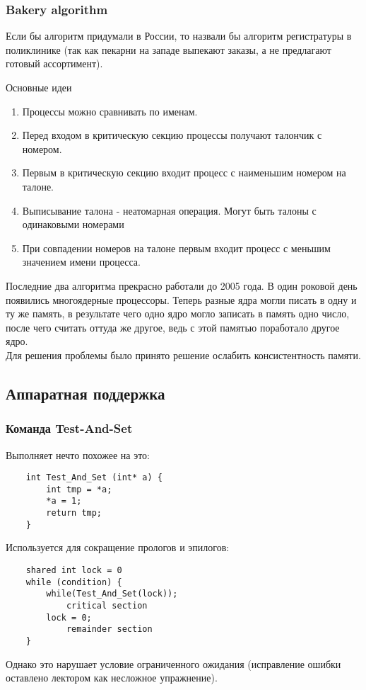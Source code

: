 \documentclass[12pt, a4paper]{article}
\begin{document}
    \subsubsection*{Bakery algorithm}
    Если бы алгоритм придумали в России, то назвали бы алгоритм регистратуры в поликлинике (так как пекарни на западе выпекают заказы, а не предлагают готовый ассортимент).
    \begin{center}
        Основные идеи
    \end{center}
    \begin{enumerate}
        \item Процессы можно сравнивать по именам.
        \item Перед входом в критическую секцию процессы получают талончик с номером.
        \item Первым в критическую секцию входит процесс с наименьшим номером на талоне.
        \item Выписывание талона - неатомарная операция. Могут быть талоны с одинаковыми номерами
        \item При совпадении номеров на талоне первым входит процесс с меньшим значением имени процесса.
    \end{enumerate}
    Последние два алгоритма прекрасно работали до 2005 года. В один роковой день появились многоядерные процессоры. Теперь разные ядра могли писать в одну и ту же память, в результате чего одно ядро могло записать в память одно число, после чего считать оттуда же другое, ведь с этой памятью поработало другое ядро.\\
    Для решения проблемы было принято решение ослабить консистентность памяти.
    \subsection*{Аппаратная поддержка}
    \subsubsection*{Команда Test-And-Set}
    Выполняет нечто похожее на это:
    \begin{lstlisting}
    int Test_And_Set (int* a) {
        int tmp = *a;
        *a = 1;
        return tmp;
    }
    \end{lstlisting}
    Используется для сокращение прологов и эпилогов:
    \begin{lstlisting}
    shared int lock = 0
    while (condition) {
        while(Test_And_Set(lock));
            critical section
        lock = 0;
            remainder section
    }
    \end{lstlisting}
    Однако это нарушает условие ограниченного ожидания (исправление ошибки оставлено лектором как несложное упражнение).
\end{document}
